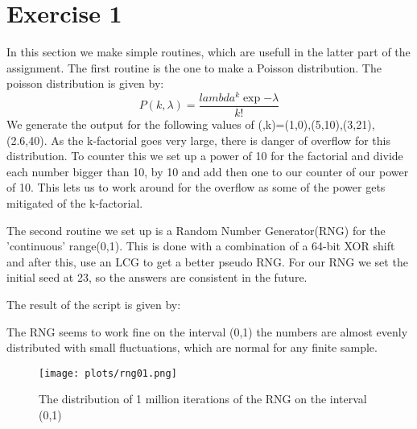 \section{Exercise 1}
In this section we make simple routines, which are usefull in the latter part of the assignment.
The first routine is the one to make a Poisson distribution. The poisson distribution is given by:
\begin{equation}
P(k,\lambda)=\frac{lambda^k\exp{-\lambda}}{k!}
\end{equation}
We generate the output for the following values of (\lambda,k)=(1,0),(5,10),(3,21),(2.6,40).
As the k-factorial goes very large, there is danger of overflow for this distribution. To counter this we set up a power of 10 for the factorial and divide each number bigger than 10, by 10 and add then one to our counter of our power of 10.
This lets us to work around for the overflow as some of the power gets mitigated of the k-factorial.

The second routine we set up is a Random Number Generator(RNG) for the 'continuous' range(0,1). This is done with a combination of a 64-bit XOR shift and after this, use an LCG to get a better pseudo RNG. For our RNG we set the initial seed at 23, so the answers are consistent in the future. 



The result of the script is given by:


The RNG seems to work fine on the interval (0,1) the numbers are almost evenly distributed with small fluctuations, which are normal for any finite sample.
\begin{figure}[h]
   \centering
   \texttt{[image: plots/rng01.png]}
      \caption{The  distribution of 1 million iterations of the RNG on the interval (0,1)}
   \end{figure}
